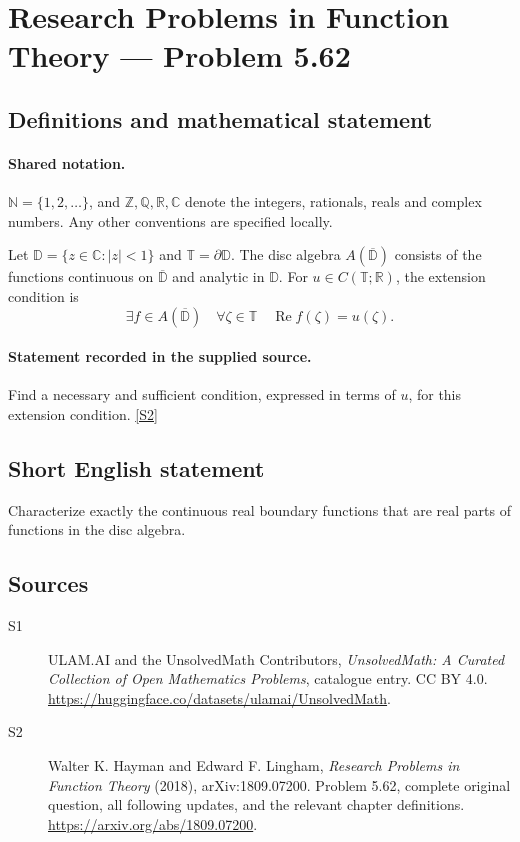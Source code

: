 \documentclass[11pt]{book}
\newcommand{\sref}[2]{\hyperlink{source:#1:#2}{[S#2]}}
\begin{document}
\section{Research Problems in Function Theory — Problem 5.62}\label{statement}

\subsection{Definitions and mathematical statement}

\paragraph{Shared notation.}$\mathbb N=\{1,2,\ldots\}$, and $\mathbb Z,\mathbb Q,\mathbb R,\mathbb C$ denote the integers, rationals, reals and complex numbers. Any other conventions are specified locally.


Let $\mathbb D=\{z\in\mathbb C:|z|<1\}$ and $\mathbb T=\partial\mathbb D$. The disc algebra $A(\overline{\mathbb D})$ consists of the functions continuous on $\overline{\mathbb D}$ and analytic in $\mathbb D$. For $u\in C(\mathbb T;\mathbb R)$, the extension condition is \[\exists f\in A(\overline{\mathbb D})\quad\forall\zeta\in\mathbb T\quad\operatorname{Re}f(\zeta)=u(\zeta).\]
\paragraph{Statement recorded in the supplied source.}
Find a necessary and sufficient condition, expressed in terms of $u$, for this extension condition. \sref{statement}{2}
\subsection{Short English statement}
Characterize exactly the continuous real boundary functions that are real parts of functions in the disc algebra.
\subsection{Sources}
\begin{description}
\item[\hypertarget{source:statement:1}{S1}] ULAM.AI and the UnsolvedMath Contributors, \emph{UnsolvedMath: A Curated Collection of Open Mathematics Problems}, catalogue entry. CC BY 4.0. \url{https://huggingface.co/datasets/ulamai/UnsolvedMath}.
\item[\hypertarget{source:statement:2}{S2}] Walter K. Hayman and Edward F. Lingham, \emph{Research Problems in Function Theory} (2018), arXiv:1809.07200. Problem 5.62, complete original question, all following updates, and the relevant chapter definitions. \url{https://arxiv.org/abs/1809.07200}.
\end{description}
\label{end:statement}
\end{document}

